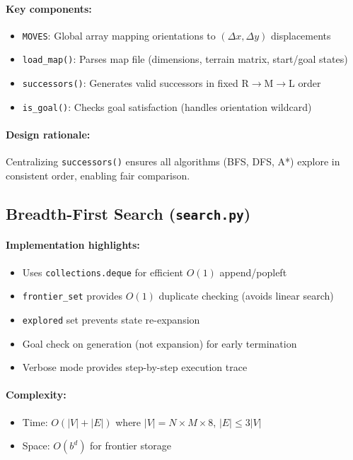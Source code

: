 \documentclass[11pt,a4paper]{article}
\begin{document}
\paragraph{Key components:}
\begin{itemize}[leftmargin=1.5cm,itemsep=0.1em]
    \item \texttt{MOVES}: Global array mapping orientations to $(\Delta x, \Delta y)$ displacements
    \item \texttt{load\_map()}: Parses map file (dimensions, terrain matrix, start/goal states)
    \item \texttt{successors()}: Generates valid successors in fixed R$\to$M$\to$L order
    \item \texttt{is\_goal()}: Checks goal satisfaction (handles orientation wildcard)
\end{itemize}

\paragraph{Design rationale:}
Centralizing \texttt{successors()} ensures all algorithms (BFS, DFS, A*) explore in consistent order, enabling fair comparison.

\subsection{Breadth-First Search (\texttt{search.py})}

\paragraph{Implementation highlights:}
\begin{itemize}[leftmargin=1.5cm,itemsep=0.1em]
    \item Uses \texttt{collections.deque} for efficient $O(1)$ append/popleft
    \item \texttt{frontier\_set} provides $O(1)$ duplicate checking (avoids linear search)
    \item \texttt{explored} set prevents state re-expansion
    \item Goal check on generation (not expansion) for early termination
    \item Verbose mode provides step-by-step execution trace
\end{itemize}

\paragraph{Complexity:}
\begin{itemize}[leftmargin=1.5cm,itemsep=0.1em]
    \item Time: $O(|V| + |E|)$ where $|V| = N \times M \times 8$, $|E| \leq 3|V|$
    \item Space: $O(b^d)$ for frontier storage
\end{itemize}
\end{document}
